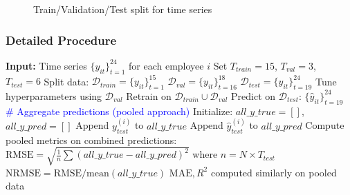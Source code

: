 \documentclass[12pt,a4paper]{article}
\begin{document}
\begin{figure}[H]
\centering
{}
\caption{Train/Validation/Test split for time series}
\end{figure}

\subsubsection{Detailed Procedure}

\begin{algorithm}[H]
\caption{Train/Validation/Test Evaluation}
\begin{algorithmic}[1]
\State \textbf{Input:} Time series $\{y_{it}\}_{t=1}^{24}$ for each employee $i$
\State Set $T_{train} = 15$, $T_{val} = 3$, $T_{test} = 6$
    \State Split data:
    \State \quad $\mathcal{D}_{train} = \{y_{it}\}_{t=1}^{15}$
    \State \quad $\mathcal{D}_{val} = \{y_{it}\}_{t=16}^{18}$
    \State \quad $\mathcal{D}_{test} = \{y_{it}\}_{t=19}^{24}$
    \State 
        \State Tune hyperparameters using $\mathcal{D}_{val}$
    \EndIf
    \State
    \State Retrain on $\mathcal{D}_{train} \cup \mathcal{D}_{val}$
    \State Predict on $\mathcal{D}_{test}$: $\{\hat{y}_{it}\}_{t=19}^{24}$
\EndFor
\State
\State \textcolor{blue}{\# Aggregate predictions (pooled approach)}
\State Initialize: $all\_y\_true = []$, $all\_y\_pred = []$
    \State Append $y_{test}^{(i)}$ to $all\_y\_true$
    \State Append $\hat{y}_{test}^{(i)}$ to $all\_y\_pred$
\EndFor
\State
\State Compute pooled metrics on combined predictions:
\State \quad $\text{RMSE} = \sqrt{\frac{1}{n}\sum(all\_y\_true - all\_y\_pred)^2}$ where $n = N \times T_{test}$
\State \quad $\text{NRMSE} = \text{RMSE} / \text{mean}(all\_y\_true)$
\State \quad $\text{MAE}, R^2$ computed similarly on pooled data
\end{algorithmic}
\end{algorithm}
\end{document}
